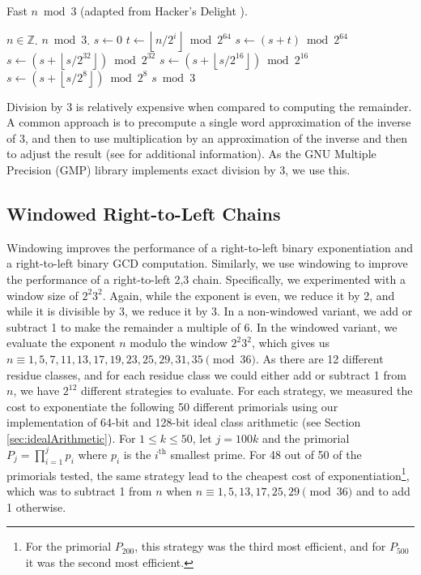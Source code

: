\documentclass{ucalgthes1}
\theoremstyle{definition}
\newcommand{\ZZ}{\mathbb{Z}}
\newcommand{\floor}[1]{\left\lfloor #1 \right\rfloor}
\begin{document}
\begin{algorithm}[h]
\caption{Fast $n \bmod 3$ (adapted from Hacker's Delight \cite{Warren2002}).}
\label{alg:fastMod3}
\begin{algorithmic}[1]
\REQUIRE $n \in \ZZ$.
\ENSURE $n \bmod 3$.
\STATE $s \gets 0$
\FOR {$i$ from $0$ to $\floor{\log_2 n}$ by 64}
	\STATE $t \gets \floor{n / 2^i} \bmod {2^{64}}$
	\STATE $s \gets (s + t) \bmod {2^{64}}$
\ENDFOR
\STATE $s \gets \left(s + \floor{s/{2^{32}}} \right) \bmod {2^{32}}$
\STATE $s \gets \left(s + \floor{s/{2^{16}}} \right) \bmod {2^{16}}$
\STATE $s \gets \left(s + \floor{s/{2^{8}}} \right) \bmod {2^{8}}$
\RETURN $s \bmod 3$ 
\end{algorithmic}
\end{algorithm}

Division by 3 is relatively expensive when compared to computing the remainder.  A common approach is to precompute a single word approximation of the inverse of 3, and then to use multiplication by an approximation of the inverse and then to adjust the result (see \cite{Granlund1994,Warren2002,Moller2011} for additional information).  As the GNU Multiple Precision (GMP) library implements exact division by 3, we use this.


\subsection{Windowed Right-to-Left Chains}

Windowing improves the performance of a right-to-left binary exponentiation and a right-to-left binary GCD computation.  Similarly, we use windowing to improve the performance of a right-to-left 2,3 chain.  Specifically, we experimented with a window size of $2^2 3^2$.  Again, while the exponent is even, we reduce it by 2, and while it is divisible by 3, we reduce it by 3.  In a non-windowed variant, we add or subtract 1 to make the remainder a multiple of 6.  In the windowed variant, we evaluate the exponent $n$ modulo the window $2^2 3^2$, which gives us $n \equiv 1, 5, 7, 11, 13, 17, 19, 23, 25, 29, 31, 35 \pmod {36}$.  As there are 12 different residue classes, and for each residue class we could either add or subtract 1 from $n$, we have $2^{12}$ different strategies to evaluate.  For each strategy, we measured the cost to exponentiate the following 50 different primorials using our implementation of 64-bit and 128-bit ideal class arithmetic (see Section \ref{sec:idealArithmetic}).  For $1 \le k \le 50$, let $j=100k$ and the primorial $P_j=\prod_{i=1}^j p_i$ where $p_i$ is the $i^{\textrm{th}}$ smallest prime.  For 48 out of 50 of the primorials tested, the same strategy lead to the cheapest cost of exponentiation\footnote{For the primorial $P_{200}$, this strategy was the third most efficient, and for $P_{500}$ it was the second most efficient.}, which was to subtract 1 from $n$ when $n \equiv 1, 5, 13, 17, 25, 29 \pmod{36}$ and to add 1 otherwise.
\end{document}
